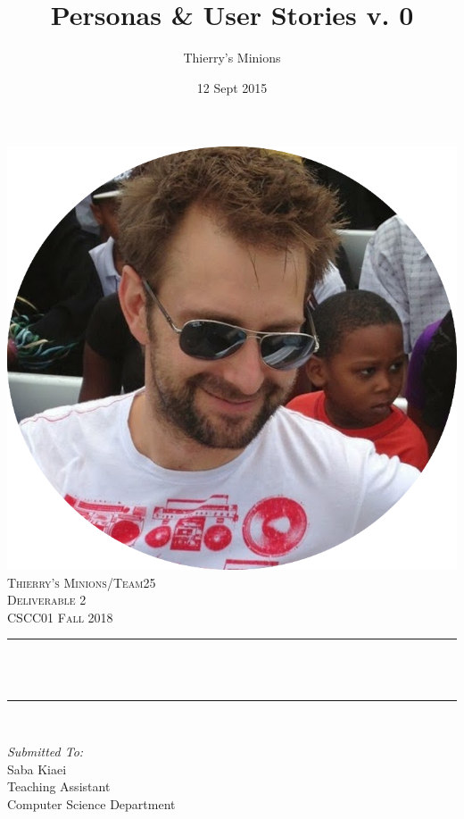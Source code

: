 \documentclass[12pt]{article}
\title{Personas \& User Stories v. 0}								%
\author{Thierry's Minions}								%
\date{12 Sept 2015}											%
\makeatletter
\let\thetitle\@title
\makeatother
\begin{document}

\begin{titlepage}
	\centering
    \vspace*{0.5 cm}
    \includegraphics[scale = 0.25]{leader.png}\\[1.0 cm]	%
    \textsc{\LARGE Thierry's Minions/Team25\\[0.5em] Deliverable 2}\\[2.0 cm]	
	\textsc{\Large CSCC01 Fall 2018}\\[0.5 cm]				%
	\rule{\linewidth}{0.2 mm} \\[0.4 cm]
	{ \huge \bfseries \thetitle}\\
	\rule{\linewidth}{0.2 mm} \\[1.5 cm]
	
	\begin{minipage}{0.4\textwidth}
		\begin{flushleft} \large
			\emph{Submitted To:}\\
			Saba Kiaei\\
            Teaching Assistant\\
            Computer Science Department\\
			\end{flushleft}
			\end{minipage}~
			\begin{minipage}{0.4\textwidth}
            

\end{minipage}
\end{titlepage}
\end{document}
